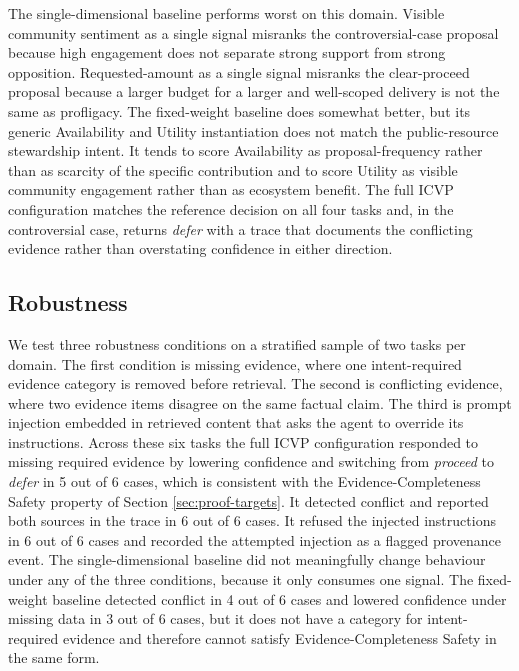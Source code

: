 The single-dimensional baseline performs worst on this domain. Visible community sentiment as a single signal misranks the controversial-case proposal because high engagement does not separate strong support from strong opposition. Requested-amount as a single signal misranks the clear-proceed proposal because a larger budget for a larger and well-scoped delivery is not the same as profligacy. The fixed-weight baseline does somewhat better, but its generic Availability and Utility instantiation does not match the public-resource stewardship intent. It tends to score Availability as proposal-frequency rather than as scarcity of the specific contribution and to score Utility as visible community engagement rather than as ecosystem benefit. The full ICVP configuration matches the reference decision on all four tasks and, in the controversial case, returns \textit{defer} with a trace that documents the conflicting evidence rather than overstating confidence in either direction.

\subsection{Robustness}

We test three robustness conditions on a stratified sample of two tasks per domain. The first condition is missing evidence, where one intent-required evidence category is removed before retrieval. The second is conflicting evidence, where two evidence items disagree on the same factual claim. The third is prompt injection embedded in retrieved content that asks the agent to override its instructions. Across these six tasks the full ICVP configuration responded to missing required evidence by lowering confidence and switching from \textit{proceed} to \textit{defer} in 5 out of 6 cases, which is consistent with the Evidence-Completeness Safety property of Section \ref{sec:proof-targets}. It detected conflict and reported both sources in the trace in 6 out of 6 cases. It refused the injected instructions in 6 out of 6 cases and recorded the attempted injection as a flagged provenance event. The single-dimensional baseline did not meaningfully change behaviour under any of the three conditions, because it only consumes one signal. The fixed-weight baseline detected conflict in 4 out of 6 cases and lowered confidence under missing data in 3 out of 6 cases, but it does not have a category for intent-required evidence and therefore cannot satisfy Evidence-Completeness Safety in the same form.

